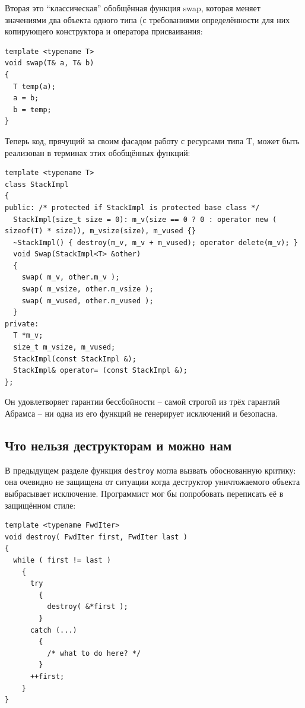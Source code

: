 \documentclass[a4paper,12pt,oneside]{article}
\begin{document}
Вторая это ``классическая'' обобщённая функция swap, которая меняет значениями два объекта одного типа (с требованиями определённости для них копирующего конструктора и оператора присваивания:

\begin{lstlisting}
template <typename T>
void swap(T& a, T& b)
{
  T temp(a);
  a = b;
  b = temp;
}
\end{lstlisting}

Теперь код, прячущий за своим фасадом работу с ресурсами типа T, может быть реализован в терминах этих обобщённых функций:

\begin{lstlisting}
template <typename T>
class StackImpl
{
public: /* protected if StackImpl is protected base class */
  StackImpl(size_t size = 0): m_v(size == 0 ? 0 : operator new ( sizeof(T) * size)), m_vsize(size), m_vused {}
  ~StackImpl() { destroy(m_v, m_v + m_vused); operator delete(m_v); }
  void Swap(StackImpl<T> &other) 
  {
    swap( m_v, other.m_v );
    swap( m_vsize, other.m_vsize );
    swap( m_vused, other.m_vused );
  }
private:
  T *m_v;
  size_t m_vsize, m_vused;
  StackImpl(const StackImpl &);
  StackImpl& operator= (const StackImpl &);
};
\end{lstlisting}

Он удовлетворяет гарантии бессбойности -- самой строгой из трёх гарантий Абрамса -- ни одна из его функций не генерирует исключений и безопасна.

\subsection{Что нельзя деструкторам и можно нам}

В предыдущем разделе функция \lstinline!destroy! могла вызвать обоснованную критику: она очевидно не защищена от ситуации когда деструктор уничтожаемого объекта выбрасывает исключение. Программист мог бы попробовать переписать её в защищённом стиле:

\begin{lstlisting}
template <typename FwdIter>
void destroy( FwdIter first, FwdIter last )
{
  while ( first != last )
    {
      try 
        {
          destroy( &*first ); 
        }
      catch (...)
        {
          /* what to do here? */
        }
      ++first;
    }
}
\end{lstlisting}
\end{document}
